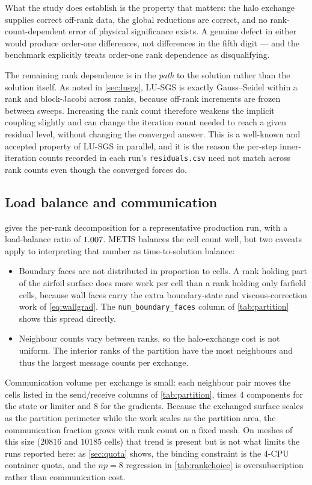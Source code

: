What the study does establish is the property that matters: the halo exchange
supplies correct off-rank data, the global reductions are correct, and no
rank-count-dependent error of physical significance exists. A genuine defect in
either would produce order-one differences, not differences in the fifth digit ---
and the benchmark explicitly treats order-one rank dependence as disqualifying.

The remaining rank dependence is in the \emph{path} to the solution rather than
the solution itself. As noted in \cref{sec:lusgs}, LU-SGS is exactly Gauss--Seidel
within a rank and block-Jacobi across ranks, because off-rank increments are
frozen between sweeps. Increasing the rank count therefore weakens the implicit
coupling slightly and can change the iteration count needed to reach a given
residual level, without changing the converged answer. This is a well-known and
accepted property of LU-SGS in parallel, and it is the reason the per-step
inner-iteration counts recorded in each run's \texttt{residuals.csv} need not match
across rank counts even though the converged forces do.

\subsection{Load balance and communication}

 gives the per-rank decomposition for a representative
production run, with a load-balance ratio of $\num{1.007}$. METIS
balances the cell count well, but two caveats apply to interpreting that number as
time-to-solution balance:

\begin{itemize}
  \item Boundary faces are not distributed in proportion to cells. A rank holding
  part of the airfoil surface does more work per cell than a rank holding only
  farfield cells, because wall faces carry the extra boundary-state and
  viscous-correction work of \cref{eq:wallgrad}. The
  \texttt{num\_boundary\_faces} column of \cref{tab:partition} shows this spread
  directly.
  \item Neighbour counts vary between ranks, so the halo-exchange cost is not
  uniform. The interior ranks of the partition have the most neighbours and thus
  the largest message counts per exchange.
\end{itemize}

Communication volume per exchange is small: each neighbour pair moves the cells
listed in the send/receive columns of \cref{tab:partition}, times 4 components for
the state or limiter and 8 for the gradients. Because the exchanged surface scales
as the partition perimeter while the work scales as the partition area, the
communication fraction grows with rank count on a fixed mesh. On meshes of this
size ($\num{20816}$ and $\num{10185}$ cells) that trend is present but is not what
limits the runs reported here: as \cref{sec:quota} shows, the binding constraint is
the 4-CPU container quota, and the $np=8$ regression in \cref{tab:rankchoice} is
oversubscription rather than communication cost.

